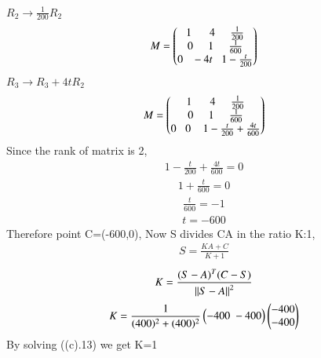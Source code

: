 \documentclass[journal]{IEEEtran}
\begin{document}
\begin{enumerate}[label=(\alph*)]
\begin{align}
            \end{align}
            {\large$R_2\rightarrow{\frac{1}{200}R_2}$}
            \begin{align}
                M = \begin{pmatrix}1\;\;\;\;\;\;4\;\;\;\;\;\frac{1}{200}\\0\;\;\;\;\;1\;\;\;\;\;\frac{1}{600}\\0\;\;\;-4t\;\;\;1-\frac{t}{200}\end{pmatrix}
            \end{align}
            {\large$R_3\rightarrow{R_3 + 4tR_2}$}
            \begin{align}
                M = \begin{pmatrix}1\;\;\;\;\;\;4\;\;\;\;\;\frac{1}{200}\\0\;\;\;\;\;1\;\;\;\;\;\frac{1}{600}\\0\;\;\;0\;\;\;\;1-\frac{t}{200}+\frac{4t}{600}\end{pmatrix}
            \end{align}
            Since the rank of matrix is 2,
            \begin{align}
                1-\frac{t}{200}+\frac{4t}{600} = 0
            \end{align}
            \begin{align}
                1 + \frac{t}{600} = 0
            \end{align}
            \begin{align}
                \frac{t}{600}=-1
            \end{align}
            \begin{align}
                t= -600
            \end{align}
            Therefore point C=(-600,0), Now S divides CA in the ratio K:1,
            \begin{align}
                S = \frac{KA+C}{K+1}
            \end{align}
            \begin{align}
                K=\frac{(S-A)^T(C-S)}{\left\lVert S-A\right\rVert^2}
            \end{align}
            \begin{align}
                K=\frac{1}{(400)^2+(400)^2}\begin{pmatrix}-400\;-400\end{pmatrix}\begin{pmatrix}-400\\-400\end{pmatrix}
            \end{align}
            By solving ((c).13) we get K=1
        \end{enumerate}
\end{document}
